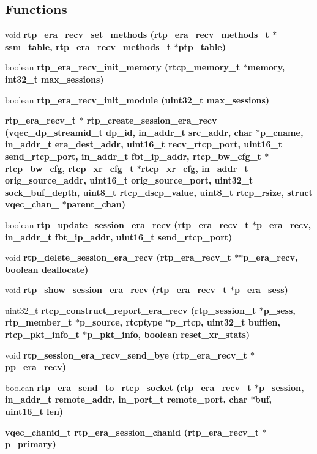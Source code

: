 \subsection*{Functions}
\begin{CompactItemize}
\item 
void \bf{rtp\_\-era\_\-recv\_\-set\_\-methods} (\bf{rtp\_\-era\_\-recv\_\-methods\_\-t} $\ast$ssm\_\-table, \bf{rtp\_\-era\_\-recv\_\-methods\_\-t} $\ast$ptp\_\-table)
\item 
boolean \bf{rtp\_\-era\_\-recv\_\-init\_\-memory} (rtcp\_\-memory\_\-t $\ast$memory, int32\_\-t max\_\-sessions)
\item 
boolean \bf{rtp\_\-era\_\-recv\_\-init\_\-module} (uint32\_\-t max\_\-sessions)
\item 
\bf{rtp\_\-era\_\-recv\_\-t} $\ast$ \bf{rtp\_\-create\_\-session\_\-era\_\-recv} (vqec\_\-dp\_\-streamid\_\-t dp\_\-id, in\_\-addr\_\-t src\_\-addr, char $\ast$p\_\-cname, in\_\-addr\_\-t era\_\-dest\_\-addr, uint16\_\-t recv\_\-rtcp\_\-port, uint16\_\-t send\_\-rtcp\_\-port, in\_\-addr\_\-t fbt\_\-ip\_\-addr, rtcp\_\-bw\_\-cfg\_\-t $\ast$rtcp\_\-bw\_\-cfg, rtcp\_\-xr\_\-cfg\_\-t $\ast$rtcp\_\-xr\_\-cfg, in\_\-addr\_\-t orig\_\-source\_\-addr, uint16\_\-t orig\_\-source\_\-port, uint32\_\-t sock\_\-buf\_\-depth, uint8\_\-t rtcp\_\-dscp\_\-value, uint8\_\-t rtcp\_\-rsize, struct \bf{vqec\_\-chan\_\-} $\ast$parent\_\-chan)
\item 
boolean \bf{rtp\_\-update\_\-session\_\-era\_\-recv} (\bf{rtp\_\-era\_\-recv\_\-t} $\ast$p\_\-era\_\-recv, in\_\-addr\_\-t fbt\_\-ip\_\-addr, uint16\_\-t send\_\-rtcp\_\-port)
\item 
void \bf{rtp\_\-delete\_\-session\_\-era\_\-recv} (\bf{rtp\_\-era\_\-recv\_\-t} $\ast$$\ast$p\_\-era\_\-recv, boolean deallocate)
\item 
void \bf{rtp\_\-show\_\-session\_\-era\_\-recv} (\bf{rtp\_\-era\_\-recv\_\-t} $\ast$p\_\-era\_\-sess)
\item 
uint32\_\-t \bf{rtcp\_\-construct\_\-report\_\-era\_\-recv} (rtp\_\-session\_\-t $\ast$p\_\-sess, rtp\_\-member\_\-t $\ast$p\_\-source, rtcptype $\ast$p\_\-rtcp, uint32\_\-t bufflen, rtcp\_\-pkt\_\-info\_\-t $\ast$p\_\-pkt\_\-info, boolean reset\_\-xr\_\-stats)
\item 
void \bf{rtp\_\-session\_\-era\_\-recv\_\-send\_\-bye} (\bf{rtp\_\-era\_\-recv\_\-t} $\ast$pp\_\-era\_\-recv)
\item 
boolean \bf{rtp\_\-era\_\-send\_\-to\_\-rtcp\_\-socket} (\bf{rtp\_\-era\_\-recv\_\-t} $\ast$p\_\-session, in\_\-addr\_\-t remote\_\-addr, in\_\-port\_\-t remote\_\-port, char $\ast$buf, uint16\_\-t len)
\item 
\bf{vqec\_\-chanid\_\-t} \bf{rtp\_\-era\_\-session\_\-chanid} (\bf{rtp\_\-era\_\-recv\_\-t} $\ast$p\_\-primary)
\end{CompactItemize}


